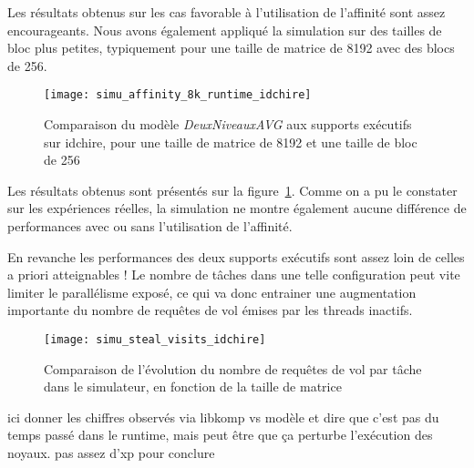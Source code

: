 Les résultats obtenus sur les cas favorable à l'utilisation de l'affinité sont assez encourageants.
Nous avons également appliqué la simulation sur des tailles de bloc plus petites, typiquement pour une taille de matrice de 8192 avec des blocs de 256.

\begin{figure}[h!]
  \centering
  \texttt{[image: simu\_affinity\_8k\_runtime\_idchire]}
  \caption{Comparaison du modèle \emph{DeuxNiveauxAVG} aux supports exécutifs sur idchire, pour une taille de matrice de 8192 et une taille de bloc de 256}\label{fig:simu:affinityavg-8k-vs-runtime:idchire}
\end{figure}



Les résultats obtenus sont présentés sur la figure~\ref{fig:simu:affinityavg-8k-vs-runtime:idchire}.
Comme on a pu le constater sur les expériences réelles, la simulation ne montre également aucune différence de performances avec ou sans l'utilisation de l'affinité.

En revanche les performances des deux supports exécutifs sont assez loin de celles a priori atteignables !
Le nombre de tâches dans une telle configuration peut vite limiter le parallélisme exposé, ce qui va donc entrainer une augmentation importante du nombre de requêtes de vol émises par les threads inactifs.

\begin{figure}[h!]
  \centering
  \texttt{[image: simu\_steal\_visits\_idchire]}
  \caption{Comparaison de l'évolution du nombre de requêtes de vol par tâche dans le simulateur, en fonction de la taille de matrice}\label{fig:simu:steals_per_task:idchire}
\end{figure}

\begin{todo}
ici donner les chiffres observés via libkomp vs modèle et dire que c'est pas du temps passé dans le runtime, mais peut être que ça perturbe l'exécution des noyaux. pas assez d'xp pour conclure
\end{todo}

